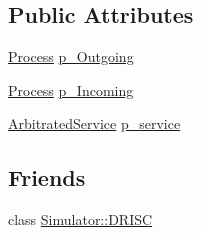 \subsection*{Public Attributes}
\begin{DoxyCompactItemize}
\item 
\hyperlink{class_simulator_1_1_process}{Process} \hyperlink{class_simulator_1_1drisc_1_1_i_cache_a42bdcd5c4c51aa0aa20ccfc1ee7fa8f4}{p\+\_\+\+Outgoing}
\item 
\hyperlink{class_simulator_1_1_process}{Process} \hyperlink{class_simulator_1_1drisc_1_1_i_cache_a8cb7be6c13ade7c94c86776ec50b8057}{p\+\_\+\+Incoming}
\item 
\hyperlink{class_simulator_1_1_arbitrated_service}{Arbitrated\+Service} \hyperlink{class_simulator_1_1drisc_1_1_i_cache_a4dffa2890e3dcb4a447c3d3a108f9d2c}{p\+\_\+service}
\end{DoxyCompactItemize}
\subsection*{Friends}
\begin{DoxyCompactItemize}
\item 
class \hyperlink{class_simulator_1_1drisc_1_1_i_cache_a14f94eb83e17d9d8841f39b37431d673}{Simulator\+::\+D\+R\+I\+S\+C}
\end{DoxyCompactItemize}


